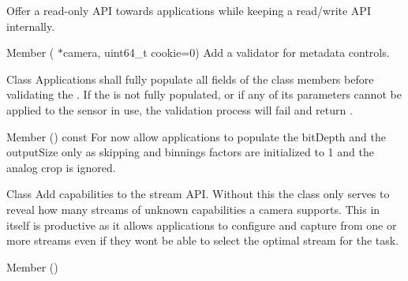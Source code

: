 \begin{DoxyRefList}
Offer a read-\/only API towards applications while keeping a read/write API internally.  
\item[Member \doxylink{classlibcamera_1_1Request_adce12d1213e5d894a5697ddd4b94b672}{libcamera\+::Request\+::Request} (\doxylink{classlibcamera_1_1Camera}{Camera} \texorpdfstring{$\ast$}{*}camera, uint64\+\_\+t cookie=0)]\label{todo__todo000041}%
%
Add a validator for metadata controls.  
\item[Class \doxylink{classlibcamera_1_1SensorConfiguration}{libcamera\+::Sensor\+Configuration} ]\label{todo__todo000014}%
%
Applications shall fully populate all fields of the  class members before validating the . If the  is not fully populated, or if any of its parameters cannot be applied to the sensor in use, the  validation process will fail and return . 
\item[Member \doxylink{classlibcamera_1_1SensorConfiguration_a6f276fafe03f0564f61da6ed4f174124}{libcamera\+::Sensor\+Configuration\+::is\+Valid} () const]\label{todo__todo000015}%
%
For now allow applications to populate the bit\+Depth and the output\+Size only as skipping and binnings factors are initialized to 1 and the analog crop is ignored. 
\item[Class \doxylink{classlibcamera_1_1Stream}{libcamera\+::Stream} ]\label{todo__todo000049}%
%
Add capabilities to the stream API. Without this the  class only serves to reveal how many streams of unknown capabilities a camera supports. This in itself is productive as it allows applications to configure and capture from one or more streams even if they won\textquotesingle{}t be able to select the optimal stream for the task.  
\item[Member \doxylink{structlibcamera_1_1StreamConfiguration_a396e09188db732ef3f8a149808d876f7}{libcamera\+::Stream\+Configuration\+::Stream\+Configuration} ()]\label{todo__todo000048}%
%

\end{DoxyRefList}
